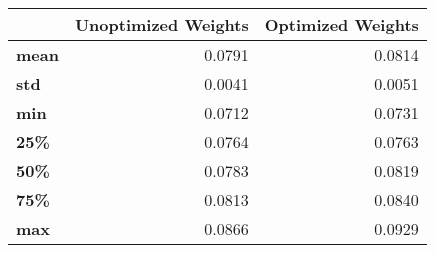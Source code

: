 \begin{tabular}{lrr}
\toprule
{} &  Unoptimized Weights &  Optimized Weights \\
\midrule
\textbf{mean} &               0.0791 &             0.0814 \\
\textbf{std } &               0.0041 &             0.0051 \\
\textbf{min } &               0.0712 &             0.0731 \\
\textbf{25\% } &               0.0764 &             0.0763 \\
\textbf{50\% } &               0.0783 &             0.0819 \\
\textbf{75\% } &               0.0813 &             0.0840 \\
\textbf{max } &               0.0866 &             0.0929 \\
\bottomrule
\end{tabular}
